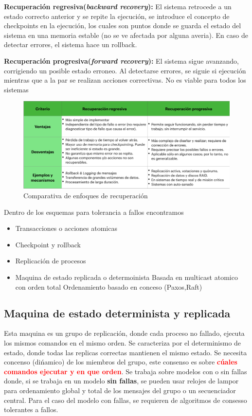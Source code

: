 \textbf{Recuperación regresiva(\textit{backward recovery}):} El sistema retrocede a un estado correcto anterior y se repite la ejecución, se introduce el concepto de checkpoints en la ejecución, los cuales son puntos donde se guarda el estado del sistema en una memoria estable (no se ve afectada por alguna averia). En caso de detectar errores, el sistema hace un rollback.

\textbf{Recuperación progresiva(\textit{forward recovery}):} El sistema sigue avanzando, corrigiendo un posible estado erroneo. Al detectarse errores, se siguie si ejecución mientras que a la par se realizan acciones correctivas. No es viable para todos los sistemas

\begin{figure}[H]
    \centering
    \includegraphics[width=1\linewidth]{img/Comparacion_enfoques.png}
    \caption{Comparativa de enfoques de recuperación}\label{fig:1761609494042}
\end{figure}

Dentro de los esquemas para tolerancia a fallos encontramos 
\begin{itemize}
    \item Transacciones o acciones atomicas
    \item Checkpoint y rollback
    \item Replicación de procesos
    \item Maquina de estado replicada o determoinista
    \subitem Basada en multicast atomico con orden total
    \subitem Ordenamiento basado en conceso (Paxos,Raft)
\end{itemize}

\subsection{Maquina de estado determinista y replicada}
Esta maquina es un grupo de replicación, donde cada proceso no fallado, ejecuta los mismos comandos en el mismo orden. Se caracteriza por el determinismo de estado, donde todas las replicas correctas mantienen el mismo estado. Se necesita concenso (dińamico) de los miembros del grupo, este consenso es sobre \textcolor{red}{\textbf{cúales comandos ejecutar y en que orden}}. Se trabaja sobre modelos con o sin fallas donde, si se trabaja en un modelo \textbf{sin fallas}, se pueden usar relojes de lampor para ordenamiento global y total de los mensajes del grupo o un secuenciador central. Para el caso del modelo con fallas, se requieren de algoritmos de consesso tolerantes a fallos. 

